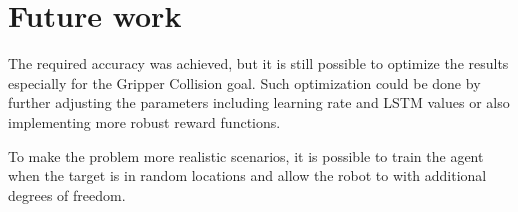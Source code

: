 \documentclass[10pt,journal,compsoc]{IEEEtran}
\begin{document}
\section{Future work}

The required accuracy was achieved, but it is still possible to optimize the results especially for the Gripper Collision goal.  Such optimization could be done by further adjusting the parameters including learning rate and LSTM values or also implementing more robust reward functions.

To make the problem more realistic scenarios, it is possible to train the agent when the target is in random locations and allow the robot to with additional degrees of freedom.
\end{document}
